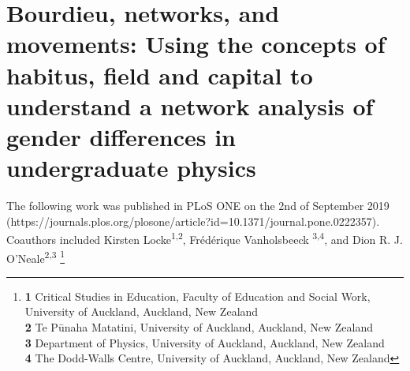 \chapter[Bourdieu, Networks, and Movements][]{Bourdieu, networks, and movements: Using the concepts of habitus, field and capital to understand a network analysis of gender differences in undergraduate physics}

The following work was published in PLoS ONE on the 2nd of September 2019 (https://journals.plos.org/plosone/article?id=10.1371/journal.pone.0222357). Coauthors included Kirsten Locke\textsuperscript{1,2}, Fr\'ed\'erique Vanholsbeeck \textsuperscript{3,4}, and 
Dion R. J. O'Neale\textsuperscript{2,3}
\footnote{\textbf{1} Critical Studies in Education, Faculty of Education and Social Work, University of Auckland, Auckland, New Zealand
\\
\textbf{2} Te P\={u}naha Matatini, University of Auckland, Auckland, New Zealand
\\
\textbf{3} Department of Physics, University of Auckland, Auckland, New Zealand
\\
\textbf{4} The Dodd-Walls Centre, University of Auckland, Auckland, New Zealand}


